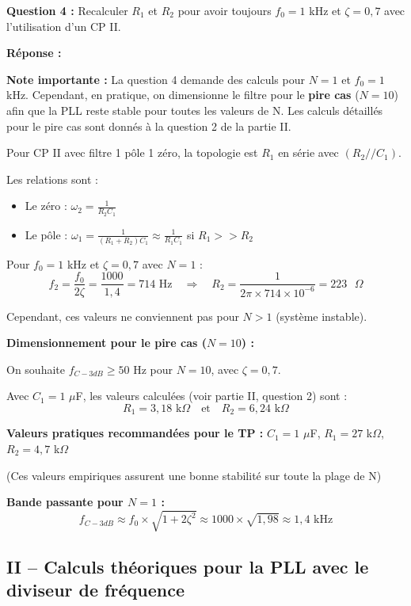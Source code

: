 \documentclass[a4paper,11pt]{article}
\begin{document}
\vspace{0.5cm}
\textbf{Question 4 :} Recalculer $R_1$ et $R_2$ pour avoir toujours $f_0 = 1$ kHz et $\zeta = 0{,}7$ avec l'utilisation d'un CP II.

\vspace{0.3cm}
\textbf{Réponse :}

\textbf{Note importante :} La question 4 demande des calculs pour $N = 1$ et $f_0 = 1$ kHz. Cependant, en pratique, on dimensionne le filtre pour le \textbf{pire cas} ($N = 10$) afin que la PLL reste stable pour toutes les valeurs de N. Les calculs détaillés pour le pire cas sont donnés à la question 2 de la partie II.

Pour CP II avec filtre 1 pôle 1 zéro, la topologie est $R_1$ en série avec $(R_2 // C_1)$.

Les relations sont :
\begin{itemize}
    \item Le zéro : $\omega_2 = \frac{1}{R_2 C_1}$
    \item Le pôle : $\omega_1 = \frac{1}{(R_1 + R_2) C_1} \approx \frac{1}{R_1 C_1}$ si $R_1 >> R_2$
\end{itemize}

Pour $f_0 = 1$ kHz et $\zeta = 0{,}7$ avec $N = 1$ :
\[
f_2 = \frac{f_0}{2\zeta} = \frac{1000}{1{,}4} = 714 \text{ Hz} \quad \Rightarrow \quad R_2 = \frac{1}{2\pi \times 714 \times 10^{-6}} = 223 \text{ }\Omega
\]

Cependant, ces valeurs ne conviennent pas pour $N > 1$ (système instable).

\textbf{Dimensionnement pour le pire cas ($N = 10$) :}

On souhaite $f_{C-3dB} \geq 50$ Hz pour $N = 10$, avec $\zeta = 0{,}7$.

Avec $C_1 = 1$ $\mu$F, les valeurs calculées (voir partie II, question 2) sont :
\[
R_1 = 3{,}18 \text{ k}\Omega \quad \text{et} \quad R_2 = 6{,}24 \text{ k}\Omega
\]

\textbf{Valeurs pratiques recommandées pour le TP :} $C_1 = 1$ $\mu$F, $R_1 = 27$ k$\Omega$, $R_2 = 4{,}7$ k$\Omega$

(Ces valeurs empiriques assurent une bonne stabilité sur toute la plage de N)

\textbf{Bande passante pour $N = 1$ :}
\[
f_{C-3dB} \approx f_0 \times \sqrt{1 + 2\zeta^2} \approx 1000 \times \sqrt{1{,}98} \approx \boxed{1{,}4 \text{ kHz}}
\]

\subsection*{II -- Calculs théoriques pour la PLL avec le diviseur de fréquence}
\end{document}
